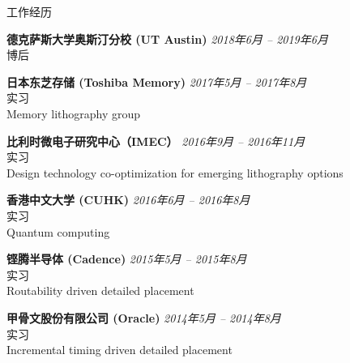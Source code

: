
\begin{rSection}{工作经历}

{\bf 德克萨斯大学奥斯汀分校 (UT Austin)}                           \hfill {\em 2018年6月 -- 2019年6月} \\
博后

{\bf 日本东芝存储 (Toshiba Memory) }                           \hfill {\em 2017年5月 -- 2017年8月} \\
实习 \\
Memory lithography group

{\bf 比利时微电子研究中心（IMEC）}                           \hfill {\em 2016年9月 -- 2016年11月} \\
实习 \\
Design technology co-optimization for emerging lithography options

{\bf 香港中文大学 (CUHK)}                           \hfill {\em 2016年6月 -- 2016年8月} \\
实习 \\
Quantum computing

{\bf 铿腾半导体 (Cadence)}                           \hfill {\em 2015年5月 -- 2015年8月} \\
实习 \\
Routability driven detailed placement

{\bf 甲骨文股份有限公司 (Oracle)}                           \hfill {\em 2014年5月 -- 2014年8月} \\
实习 \\
Incremental timing driven detailed placement


\end{rSection}


